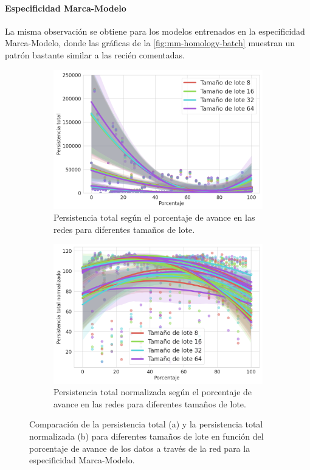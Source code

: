 \paragraph{Especificidad Marca-Modelo}

La misma observación se obtiene para los modelos entrenados en la especificidad Marca-Modelo, donde las gráficas de la \autoref{fig:mm-homology-batch} muestran un patrón bastante similar a las recién comentadas.

\begin{figure}[H]
	\centering
	\begin{subfigure}{.5\textwidth}
		\centering
		\includegraphics[width=\linewidth]{img/mm_batch.png}
		\caption{Persistencia total según el porcentaje de avance en las redes para diferentes tamaños de lote.}
		\label{fig:mm-homology-batch-1}
	\end{subfigure}%
	\begin{subfigure}{.5\textwidth}
		\centering
		\includegraphics[width=\linewidth]{img/mm_batch_norm.png}
		\caption{Persistencia total normalizada según el porcentaje de avance en las redes para diferentes tamaños de lote.}
		\label{fig:mm-homology-batch-2}
	\end{subfigure}
	\caption{Comparación de la persistencia total (a) y la persistencia total normalizada (b) para diferentes tamaños de lote en función del porcentaje de avance de los datos a través de la red para la especificidad Marca-Modelo.}
	\label{fig:mm-homology-batch}
\end{figure}

